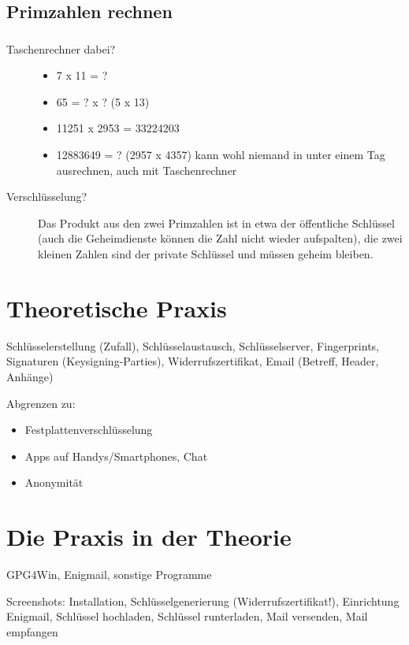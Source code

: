\documentclass[compress]{beamer}
\begin{document}
\subsection{Primzahlen rechnen}
\begin{frame}
  \frametitle{\insertsubsection}
  \begin{description}
  \item[Taschenrechner dabei?]
    \begin{itemize}
    \item 7 x 11 = ?
    \item 65 = ? x ? (5 x 13)
    \item 11251 x 2953 = 33224203
    \item 12883649 = ? (2957 x 4357) kann wohl niemand in unter einem
      Tag ausrechnen, auch mit Taschenrechner
    \end{itemize}
  \item[Verschlüsselung?] Das Produkt aus den zwei Primzahlen ist in
    etwa der öffentliche Schlüssel (auch die Geheimdienste können die
    Zahl nicht wieder aufspalten), die zwei kleinen Zahlen sind der
    private Schlüssel und müssen geheim bleiben.
  \end{description}
\end{frame}

\section{Theoretische Praxis}
\label{sec-1-1-4}

Schlüsselerstellung (Zufall), Schlüsselaustausch, Schlüsselserver,
Fingerprints, Signaturen (Keysigning-Parties), Widerrufszertifikat,
Email (Betreff, Header, Anhänge)

Abgrenzen zu:
\begin{itemize}
\item Festplattenverschlüsselung
\item Apps auf Handys/Smartphones, Chat
\item Anonymität
\end{itemize}
\section{Die Praxis in der Theorie}
\label{sec-1-1-5}

GPG4Win, Enigmail, sonstige Programme

Screenshots: Installation, Schlüsselgenerierung
(Widerrufszertifikat!), Einrichtung Enigmail, Schlüssel hochladen,
Schlüssel runterladen, Mail versenden, Mail empfangen
\end{document}
